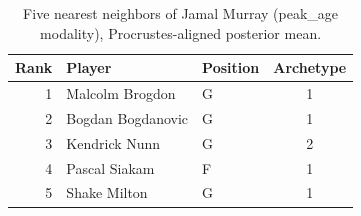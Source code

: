 \begin{table}[htbp]
  \centering\small
  \begin{tabular}{rllc}
    \toprule
    Rank & Player & Position & Archetype \\
    \midrule
    1 & Malcolm Brogdon & G & 1 \\
    2 & Bogdan Bogdanovic & G & 1 \\
    3 & Kendrick Nunn & G & 2 \\
    4 & Pascal Siakam & F & 1 \\
    5 & Shake Milton & G & 1 \\
    \bottomrule
  \end{tabular}
  \caption{Five nearest neighbors of Jamal Murray (peak_age modality), Procrustes-aligned posterior mean.}
  \label{tab:Jamal_Murray_neighbors_peak_age}
\end{table}

